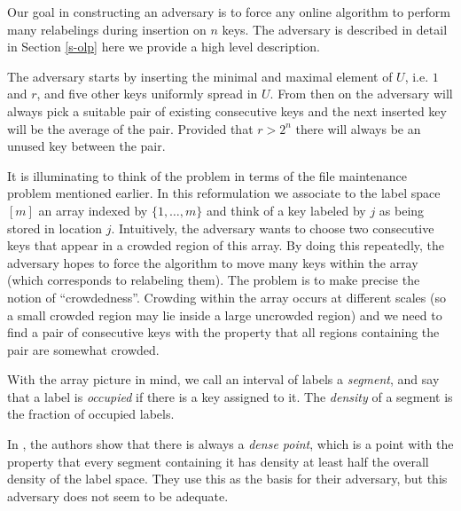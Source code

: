 \documentclass[runningheads,a4paper]{llncs}
\begin{document}
Our goal in constructing an adversary is to force any online algorithm to perform many relabelings during insertion on $n$ keys. 
The adversary is described
in detail in Section \ref{s-olp} here we provide a high level description.

The adversary starts by inserting the minimal and maximal element of $U$, i.e. $1$ and $r$, and five other keys uniformly spread in $U$.
From then on the adversary will always pick a suitable pair of existing consecutive keys and the next inserted key
will be the average of the pair. Provided that $r>2^n$ there will always be an unused key between the pair.


It is illuminating to think of the problem in terms of the file maintenance problem
mentioned earlier.  In this reformulation we associate to the label space $[m]$ an array indexed by $\{1,\ldots,m\}$ and think of
a key labeled by $j$ as being stored in location $j$. Intuitively, 
the adversary wants to choose two consecutive keys that appear in a crowded region of this array.  By doing this repeatedly,
the adversary hopes to force
the algorithm to move many keys within the array (which corresponds to relabeling them). 
The problem is to make precise the notion of ``crowdedness''.  Crowding within the array occurs at different scales (so a small crowded region may lie inside
a large uncrowded region)  and we need to find a pair of consecutive keys with the property that all regions containing the pair are
somewhat crowded.

With the array picture in mind,
we  call an interval of labels a \emph{segment}, and say that a label is {\em occupied} if there is a key assigned to it. 
The \emph{density} of a segment is the fraction of occupied labels.   

In \cite{DSZ04}, the authors show that there is always a \emph{dense point}, which is
a point  with the property that every segment containing it
has density at least half the overall density of the label space.  They use this as the basis for their
adversary, but this adversary does not seem to be adequate.
\end{document}
